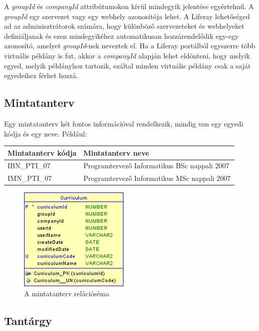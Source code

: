 \documentclass[hidelinks, 12pt, a4paper]{report}
\begin{document}
A \emph{groupId} és \emph{companyId} attribútumokon kívül mindegyik jelentése egyértelmű. A \emph{groupId} egy szervezet vagy egy webhely azonosítója lehet. A Liferay lehetőséged ad az adminisztrátorok számára, hogy különböző szervezeteket és webhelyeket definiáljanak és ezen mindegyikéhez automatikusan hozzárendelődik egy-egy azonosító, amelyet \emph{groupId}-nek neveztek el. Ha a Liferay portálból egyszerre több virtuális példány is fut, akkor a \emph{companyId} alapján lehet eldönteni, hogy melyik egyed, melyik példányhoz tartozik, ezáltal minden virtuális példány csak a saját egyedeihez férhet hozzá.

\subsection{Mintatanterv}

Egy mintatanterv két fontos információval rendelkezik, mindig van egy egyedi kódja és egy neve. Például:

\begin{table}[H]
	\centering
	\begin{tabular}{| l | l |}
	\hline
	\textbf{Mintatanterv kódja} & \textbf{Mintatanterv neve} \\
	\hline
	IBN\_PTI\_07 & Programtervező Informatikus BSc nappali 2007 \\
	\hline
	IMN\_PTI\_07 & Programtervező Informatikus MSc nappali 2007 \\
	\hline
\end{tabular}
\end{table}

\begin{figure}[H]
    \centering
	\includegraphics{curriculum.png}
	\caption{A mintatanterv relációséma}
\end{figure}

\subsection{Tantárgy}
\end{document}
